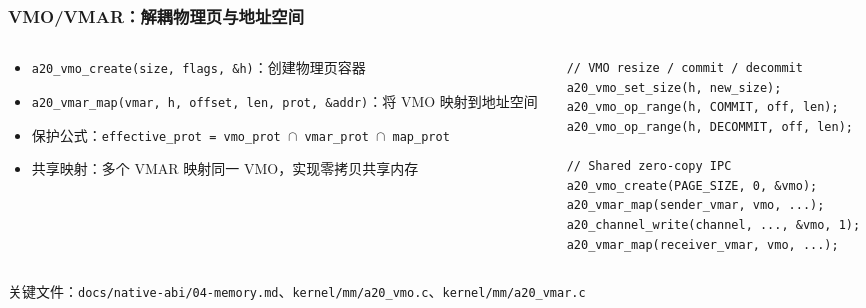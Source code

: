 \documentclass[aspectratio=1610]{beamer}
\newcommand{\code}[1]{\texttt{\footnotesize #1}}
\begin{document}
\begin{frame}[fragile]
    \frametitle{VMO/VMAR：解耦物理页与地址空间}
    \begin{columns}
        \begin{column}{0.52\textwidth}
            \footnotesize
            \begin{itemize}
                \item \code{a20\_vmo\_create(size, flags, \&h)}：创建物理页容器
                \item \code{a20\_vmar\_map(vmar, h, offset, len, prot, \&addr)}：将 VMO 映射到地址空间
                \item 保护公式：\code{effective\_prot = vmo\_prot $\cap$ vmar\_prot $\cap$ map\_prot}
                \item 共享映射：多个 VMAR 映射同一 VMO，实现零拷贝共享内存
            \end{itemize}
        \end{column}
        \begin{column}{0.45\textwidth}
            \begin{lstlisting}[basicstyle=\ttfamily\tiny]
// VMO resize / commit / decommit
a20_vmo_set_size(h, new_size);
a20_vmo_op_range(h, COMMIT, off, len);
a20_vmo_op_range(h, DECOMMIT, off, len);

// Shared zero-copy IPC
a20_vmo_create(PAGE_SIZE, 0, &vmo);
a20_vmar_map(sender_vmar, vmo, ...);
a20_channel_write(channel, ..., &vmo, 1);
a20_vmar_map(receiver_vmar, vmo, ...);
            \end{lstlisting}
        \end{column}
    \end{columns}
    \vspace{0.3em}
    \small 关键文件：\code{docs/native-abi/04-memory.md}、\code{kernel/mm/a20\_vmo.c}、\code{kernel/mm/a20\_vmar.c}
\end{frame}
\end{document}

